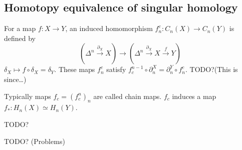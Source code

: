 \documentclass[12pt]{article}					%
\begin{document}
\subsection{Homotopy equivalence of singular homology}
\begin{definice}
	For a map $f: X \rightarrow Y$, an induced homomorphism $f_n^c: C_n(X) \rightarrow C_n(Y)$ is defined by
	$$ (Δ^n \overset{\partial_X}\rightarrow X) \rightarrow (Δ^n \overset{\partial_X}\rightarrow X \overset{f}\rightarrow Y) $$
	$δ_X \mapsto f∘δ_X = δ_Y$. These maps $f_n^c$ satisfy $f_c^{n-1}∘\partial_n^X = \partial_n^Y ∘ f_n^c$. TODO?(This is since…)

	Typically maps $f_c = (f_c^n)_n$ are called chain maps. $f_c$ induces a map $f_*: H_n(X) \simeq H_n(Y)$.

	TODO?
\end{definice}


TODO? (Problems)


\end{document}
